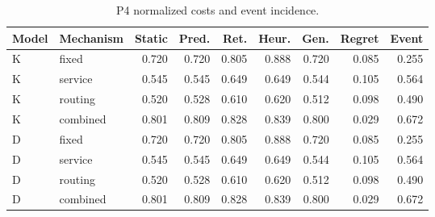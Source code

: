 \begin{table}[htbp]\caption{P4 normalized costs and event incidence.}\centering\small\setlength{\tabcolsep}{3pt}

\begin{tabular}{llrrrrrrr}\toprule

Model & Mechanism & Static & Pred. & Ret. & Heur. & Gen. & Regret & Event\\\midrule

K & fixed & 0.720 & 0.720 & 0.805 & 0.888 & 0.720 & 0.085 & 0.255\\

K & service & 0.545 & 0.545 & 0.649 & 0.649 & 0.544 & 0.105 & 0.564\\

K & routing & 0.520 & 0.528 & 0.610 & 0.620 & 0.512 & 0.098 & 0.490\\

K & combined & 0.801 & 0.809 & 0.828 & 0.839 & 0.800 & 0.029 & 0.672\\

D & fixed & 0.720 & 0.720 & 0.805 & 0.888 & 0.720 & 0.085 & 0.255\\

D & service & 0.545 & 0.545 & 0.649 & 0.649 & 0.544 & 0.105 & 0.564\\

D & routing & 0.520 & 0.528 & 0.610 & 0.620 & 0.512 & 0.098 & 0.490\\

D & combined & 0.801 & 0.809 & 0.828 & 0.839 & 0.800 & 0.029 & 0.672\\

\bottomrule\end{tabular}\end{table}

